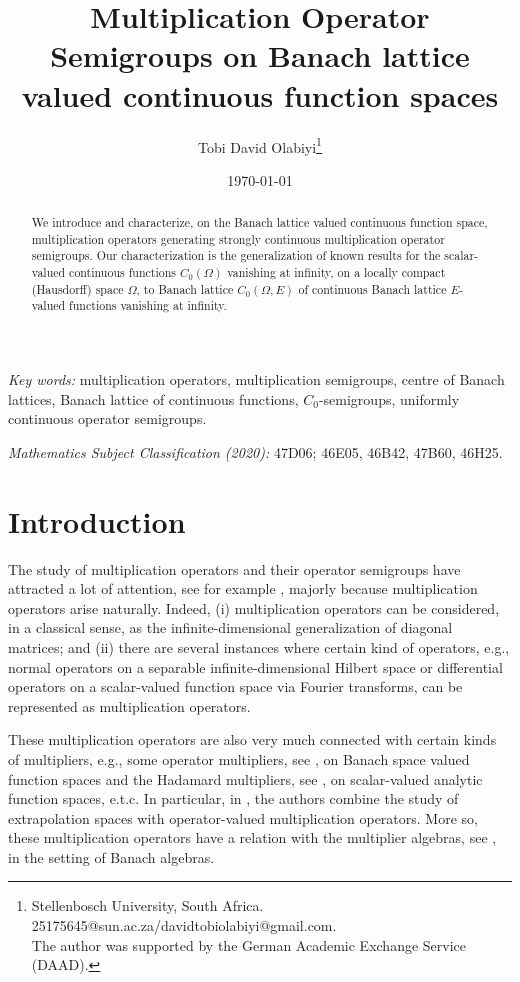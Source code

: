 \documentclass{article}
\title{ Multiplication Operator Semigroups on Banach lattice valued continuous function spaces }
\author{Tobi David Olabiyi\footnote{Stellenbosch University, South Africa.\\ 25175645@sun.ac.za/davidtobiolabiyi@gmail.com.\\
	The author was supported by the German Academic Exchange Service (DAAD).}
}
\date{\today}
\newenvironment{AMS}{}{}
\newenvironment{keywords}{}{}
\newcommand{\Om}{\Omega}
\begin{document}
	\maketitle
	\begin{abstract}
		We introduce and characterize, on the Banach lattice valued continuous function space, multiplication operators generating strongly continuous multiplication operator semigroups. Our characterization is the generalization of  known results for the scalar-valued continuous  functions $C_0(\Om)$ vanishing at infinity, on a locally compact (Hausdorff) space $\Om$, to Banach lattice $C_0(\Om, E)$ of continuous  Banach lattice $E$-valued functions vanishing at infinity.
	\end{abstract}
	
	\begin{keywords}
	  \textit{Key words:}  multiplication operators, multiplication semigroups, centre of Banach lattices, Banach lattice of continuous functions, $C_0$-semigroups, uniformly continuous operator semigroups.
	\end{keywords}
	
	\begin{AMS}
	  \textit{Mathematics Subject Classification (2020):}   47D06; 46E05, 46B42, 47B60, 46H25.
	\end{AMS}
	
	
	
	\begingroup
	\hypersetup{linkcolor=black}
	\tableofcontents
	\endgroup	
\section{Introduction}\label{sec:intro}

The study of multiplication operators and their operator semigroups have attracted a lot of attention, see for example \cite{Holderrieth91,van1993abstract,Heymann2013, hudzik2014multiplication,MerveSerkanEmrah2020}, majorly because multiplication operators arise naturally. Indeed, (i) multiplication operators can be considered, in a classical sense, as the infinite-dimensional generalization of diagonal matrices; and (ii)
there are several instances where certain kind of operators, e.g., normal operators on a separable infinite-dimensional Hilbert space  or differential operators on a scalar-valued function space via Fourier transforms, can be represented as multiplication operators.

These multiplication operators are also very much connected with certain kinds of multipliers, e.g., some operator multipliers, see \cite{Graser97}, on Banach space valued function spaces and the  Hadamard multipliers, see \cite{Anna2018}, on scalar-valued analytic function spaces, e.t.c.  In particular, in \cite{Graser97, ChristianRetha22}, the authors combine the study of extrapolation spaces with operator-valued multiplication operators. More so, these multiplication operators have  a relation with the  multiplier algebras, see \cite{TodorovTurowska2010}, in the setting of Banach algebras.
\end{document}
